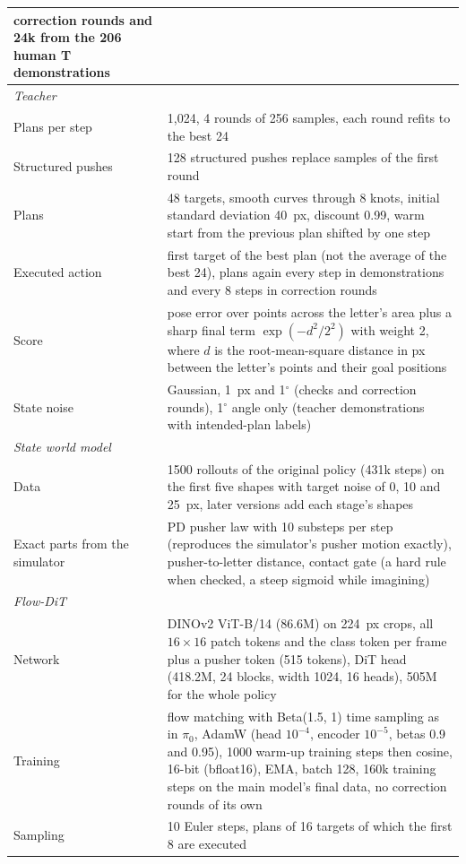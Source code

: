 \documentclass[10pt,twocolumn,letterpaper]{article}
\begin{document}
\begin{table}[!htbp]
\begin{tabular}{p{4.2cm}p{12.6cm}}
      correction rounds and 24k from the 206 human T demonstrations \\
    \midrule
    \multicolumn{2}{l}{\textit{Teacher}} \\
    Plans per step & 1,024, 4 rounds of 256 samples, each round refits to the best 24 \\
    Structured pushes & 128 structured pushes replace samples of the first round \\
    Plans & 48 targets, smooth curves through 8 knots, initial standard deviation 40~px, discount 0.99, warm start from the previous
      plan shifted by one step \\
    Executed action & first target of the best plan (not the average of the best 24), plans again every step in
      demonstrations and every 8 steps in correction rounds \\
    Score & pose error over points across the letter's area plus a sharp final term $\exp(-d^2/2^2)$ with weight 2,
      where $d$ is the root-mean-square distance in px between the letter's points and their goal positions \\
    State noise & Gaussian, 1~px and 1$^\circ$ (checks and correction rounds), 1$^\circ$ angle only (teacher
      demonstrations with intended-plan labels) \\
    \midrule
    \multicolumn{2}{l}{\textit{State world model}} \\
    Data & 1500 rollouts of the original policy (431k steps) on the first five shapes with target noise of 0, 10
      and 25~px, later versions add each stage's shapes \\
    Exact parts from the simulator & PD pusher law with 10 substeps per step (reproduces the simulator's pusher motion
      exactly), pusher-to-letter distance, contact gate (a hard rule when checked, a steep sigmoid while imagining) \\
    \midrule
    \multicolumn{2}{l}{\textit{Flow-DiT}} \\
    Network & DINOv2 ViT-B/14 (86.6M) on 224~px crops, all $16\times16$ patch tokens and the class token per frame plus
      a pusher token (515 tokens), DiT head (418.2M, 24 blocks, width 1024, 16 heads), 505M for the whole policy \\
    Training & flow matching with Beta(1.5, 1) time sampling as in $\pi_0$, AdamW (head $10^{-4}$, encoder $10^{-5}$,
      betas 0.9 and 0.95), 1000 warm-up training steps then cosine, 16-bit (bfloat16), EMA, batch 128, 160k training
      steps on the main model's final data, no correction rounds of its own \\
    Sampling & 10 Euler steps, plans of 16 targets of which the first 8 are executed \\
    \bottomrule
  \end{tabular}
\end{table}
\end{document}

